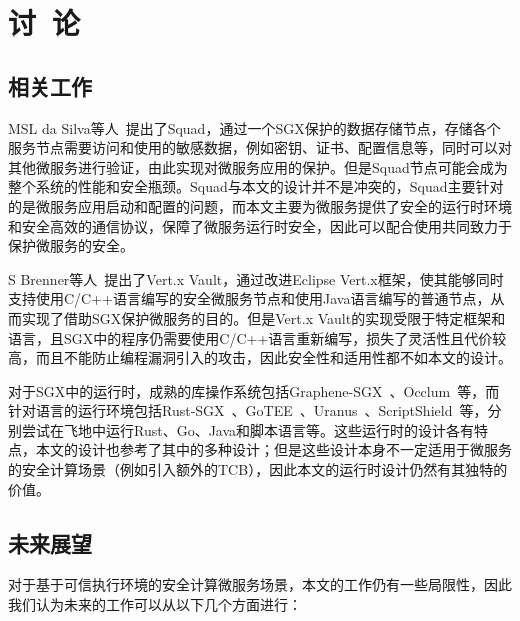 \section{讨\ 论}\label{sec:discussion}

\subsection{相关工作}

MSL da Silva等人~\cite{da2019squad}提出了Squad，通过一个SGX保护的数据存储节点，存储各个服务节点需要访问和使用的敏感数据，例如密钥、证书、配置信息等，同时可以对其他微服务进行验证，由此实现对微服务应用的保护。但是Squad节点可能会成为整个系统的性能和安全瓶颈。Squad与本文的设计并不是冲突的，Squad主要针对的是微服务应用启动和配置的问题，而本文主要为微服务提供了安全的运行时环境和安全高效的通信协议，保障了微服务运行时安全，因此可以配合使用共同致力于保护微服务的安全。

S Brenner等人~\cite{brenner2017secure}提出了Vert.x Vault，通过改进Eclipse Vert.x框架，使其能够同时支持使用C/C++语言编写的安全微服务节点和使用Java语言编写的普通节点，从而实现了借助SGX保护微服务的目的。但是Vert.x Vault的实现受限于特定框架和语言，且SGX中的程序仍需要使用C/C++语言重新编写，损失了灵活性且代价较高，而且不能防止编程漏洞引入的攻击，因此安全性和适用性都不如本文的设计。

对于SGX中的运行时，成熟的库操作系统包括Graphene-SGX~\cite{tsai2017graphene}、Occlum~\cite{shen2020occlum}等，而针对语言的运行环境包括Rust-SGX~\cite{wang2019towards}、GoTEE~\cite{ghosn2019secured}、Uranus~\cite{jiang2020uranus}、ScriptShield~\cite{wang2019running}等，分别尝试在飞地中运行Rust、Go、Java和脚本语言等。这些运行时的设计各有特点，本文的设计也参考了其中的多种设计；但是这些设计本身不一定适用于微服务的安全计算场景（例如引入额外的TCB），因此本文的运行时设计仍然有其独特的价值。

\subsection{未来展望}

对于基于可信执行环境的安全计算微服务场景，本文的工作仍有一些局限性，因此我们认为未来的工作可以从以下几个方面进行：

